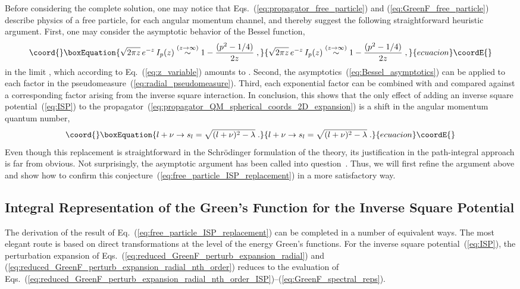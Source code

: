 \documentclass[a4paper,preprint,draft,showpacs,amsmath,amsfonts,amssymb,aps,prd]{revtex4}%
\begin{document}
Before considering the 
complete solution, 
one may notice that 
Eqs.~(\ref{eq:propagator_free_particle}) and (\ref{eq:GreenF_free_particle})
describe physics of a free particle, for each angular momentum channel,
and thereby suggest the following straightforward heuristic argument.
First,   
one may consider 
  the asymptotic
behavior of the Bessel function,
\begin{equation}\coord{}\boxEquation{ 
\sqrt{2 \pi z} \,
e^{-z}
\,
 I_{p}(z) \stackrel{(z \rightarrow \infty)}{\sim} 
1 - \frac{(p^{2} -1/4)}{2z}
\; ,
\label{eq:Bessel_asymptotics}
}{ 
\sqrt{2 \pi z} \,
e^{-z}
\,
 I_{p}(z) \stackrel{(z \rightarrow \infty)}{\sim} 
1 - \frac{(p^{2} -1/4)}{2z}
\; ,
}{ecuacion}\coordE{}\end{equation}
in the limit
\coordHE{},
which according to Eq.~(\ref{eq:z_variable}) amounts to \coordHE{}.
Second, 
the asymptotics~(\ref{eq:Bessel_asymptotics}) can be applied 
to each factor in the pseudomeasure~(\ref{eq:radial_pseudomeasure}).
Third, each exponential factor can be combined with and compared against a corresponding 
factor arising from the inverse square interaction.
In conclusion,
this
shows that the only effect of adding an inverse square potential~(\ref{eq:ISP}) 
to the propagator~(\ref{eq:propagator_QM_spherical_coords_2D_expansion})
is a shift in the angular momentum quantum number,
\begin{equation}\coord{}\boxEquation{
l+ \nu \rightarrow s_{l}
=\sqrt{ (l+\nu)^{2} - \lambda}
\;  .
\label{eq:free_particle_ISP_replacement}
}{
l+ \nu \rightarrow s_{l}
=\sqrt{ (l+\nu)^{2} - \lambda}
\;  .
}{ecuacion}\coordE{}\end{equation}
Even though this replacement is straightforward in the 
Schr\"{o}dinger formulation of the theory,
its justification in the path-integral approach 
is far from obvious. Not surprisingly,
the asymptotic argument has been called into 
question~\cite{kleinert}. Thus, 
 we will first refine the argument above and 
show how to confirm this conjecture~(\ref{eq:free_particle_ISP_replacement})
in a more satisfactory way.


\subsection{Integral Representation of the Green's Function for the Inverse Square Potential} 
\label{sec:integral_representation_ISP}


The derivation of the result of Eq.~(\ref{eq:free_particle_ISP_replacement})
can be completed in a number of equivalent ways. The 
most elegant route is based on direct transformations at the level of the
 energy Green's functions. 
For the inverse square potential~(\ref{eq:ISP}),
the perturbation expansion of Eqs.~(\ref{eq:reduced_GreenF_perturb_expansion_radial})
and (\ref{eq:reduced_GreenF_perturb_expansion_radial_nth_order})
reduces to the evaluation of 
Eqs.~(\ref{eq:reduced_GreenF_perturb_expansion_radial_nth_order_ISP})--(\ref{eq:GreenF_spectral_reps}).
\end{document}
